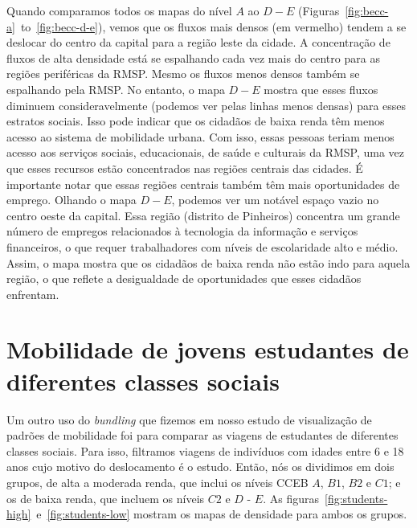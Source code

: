 Quando comparamos todos os mapas do nível $A$ ao $D-E$
(Figuras~\ref{fig:becc-a}~to~\ref{fig:becc-d-e}), vemos que os fluxos mais
densos (em vermelho) tendem a se deslocar do centro da capital para a região
leste da cidade. A concentração de fluxos de alta densidade está se espalhando
cada vez mais do centro para as regiões periféricas da RMSP. Mesmo os fluxos
menos densos também se espalhando pela RMSP. No entanto, o mapa $D-E$ mostra que
esses fluxos diminuem consideravelmente (podemos ver pelas linhas menos densas)
para esses estratos sociais. Isso pode indicar que os cidadãos de baixa renda
têm menos acesso ao sistema de mobilidade urbana. Com isso, essas pessoas teriam
menos acesso aos serviços sociais, educacionais, de saúde e culturais da RMSP,
uma vez que esses recursos estão concentrados nas regiões centrais das cidades.
É importante notar que essas regiões centrais também têm mais oportunidades de
emprego. Olhando o mapa $D-E$, podemos ver um notável espaço vazio no centro
oeste da capital. Essa região (distrito de Pinheiros) concentra um grande número
de empregos relacionados à tecnologia da informação e serviços financeiros, o
que requer trabalhadores com níveis de escolaridade alto e médio. Assim, o mapa
mostra que os cidadãos de baixa renda não estão indo para aquela região, o que
reflete a desigualdade de oportunidades que esses cidadãos enfrentam.

\section{Mobilidade de jovens estudantes de diferentes classes sociais}
\label{sec:students}

Um outro uso do \emph{bundling} que fizemos em nosso estudo de visualização de padrões de
mobilidade foi para comparar as viagens de estudantes de diferentes classes
sociais. Para isso, filtramos viagens de indivíduos com idades entre 6 e 18 anos
cujo motivo do deslocamento é o estudo. Então, nós os dividimos em dois grupos,
de alta a moderada renda, que inclui os níveis CCEB $A$, $B1$, $B2$ e $C1$; e os
de baixa renda, que incluem os níveis $C2$ e $D$ - $E$. As
figuras~\ref{fig:students-high}~e~\ref{fig:students-low} mostram os mapas de
densidade para ambos os grupos.

